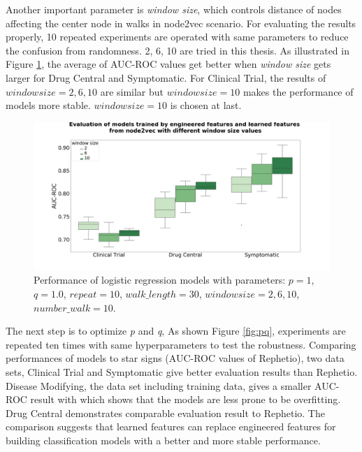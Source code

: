 Another important parameter is \textit{window size}, which controls distance of nodes affecting the center node in walks in node2vec scenario. For evaluating the results properly, 10 repeated experiments are operated with same parameters to reduce the confusion from randomness. 2, 6, 10 are tried in this thesis. As illustrated in Figure \ref{fig:window_size}, the average of AUC-ROC values get better when \textit{window size} gets larger for Drug Central and Symptomatic. For Clinical Trial, the results of $window size = 2, 6, 10$ are similar but $window size = 10$ makes the performance of models more stable. $window size = 10$ is chosen at last. 

\begin{figure}[!h]
    \centering
    \includegraphics[scale=0.2]
    {figures/window_size.png}
    \captionsetup{justification=centering}
    \caption[Evaluation of different window\_size in node2vec]{\label{fig:window_size}Performance of logistic regression models with parameters: $p = 1$, $q = 1.0$, $repeat = 10$, $walk\_length = 30$, $window size = 2, 6, 10$, $number\_walk = 10$.
}
\end{figure}

The next step is to optimize \textit{p} and \textit{q}, As shown Figure \ref{fig:pq}, experiments are repeated ten times with same hyperparameters to test the robustness. Comparing performances of models to star signs (\ac{AUC-ROC} values of Rephetio), two data sets, Clinical Trial and Symptomatic give better evaluation results than Rephetio. Disease Modifying, the data set including training data, gives a smaller \ac{AUC-ROC} result with which shows that the models are less prone to be overfitting. Drug Central demonstrates comparable evaluation result to Rephetio. The comparison suggests that learned features can replace engineered features for building classification models with a better and more stable performance.

